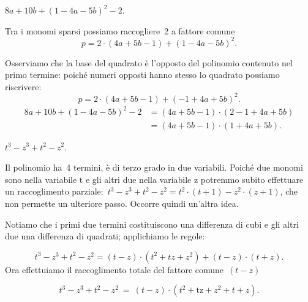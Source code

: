  \begin{esempio}
 $8a+10b+\left(1-4a-5b\right)^{2}-2$.

Tra i monomi sparsi possiamo raccogliere~2 a fattore comune
\[p=2\cdot \left(4a+5b-1\right)+\left(1-4a-5b\right)^{2}.\]

Osserviamo che la base del quadrato è l'opposto del polinomio contenuto
nel primo termine: poiché numeri opposti hanno
stesso lo quadrato possiamo riscrivere:
\[p=2\cdot\left(4a+5b-1\right)+\left(-1+4a+5b\right)^{2}.\]
\begin{align*}
8a+10b+(1-4a-5b)^{2}-2&=\left(4a+5b-1\right)\cdot\left(2-1+4a+5b\right)\\
&=\left(4a+5b-1\right)\cdot\left(1+4a+5b\right).
\end{align*}
 \end{esempio}

 \begin{esempio}
 $t^{{3}}-z^{{3}}+t^{2}-z^{2}$.

Il polinomio ha~4 termini, è di terzo grado in due variabili.
Poiché due monomi sono nella variabile t e gli altri due nella
variabile z potremmo subito effettuare un raccoglimento
parziale:~$t^{{3}}-z^{{3}}+t^{2}-z^{2}=
           t^{2}\cdot\left(t+1\right)-z^{2}\cdot \left(z+1\right)$,
che non permette un ulteriore passo. Occorre quindi un'altra idea.

Notiamo che i primi due termini costituiscono una differenza di cubi e
gli altri due una differenza di quadrati; applichiamo le regole:

\begin{equation*}
t^{{3}}-z^{{3}}+t^{2}-z^{2}=\left(t-z\right)\cdot
\left(t^{2}+tz+z^{2}\right)+\left(t-z\right)\cdot
\left(t+z\right).
\end{equation*}
Ora effettuiamo il raccoglimento totale del fattore comune~$(t-z)$

\begin{equation*}
t^{3}-z^{3}+t^{2}-z^{2}\ =\ \left(t-z\right)\cdot
\left(t^{2}+{\text{tz}}+z^{2}+t+z\right).
\end{equation*}
 \end{esempio}

